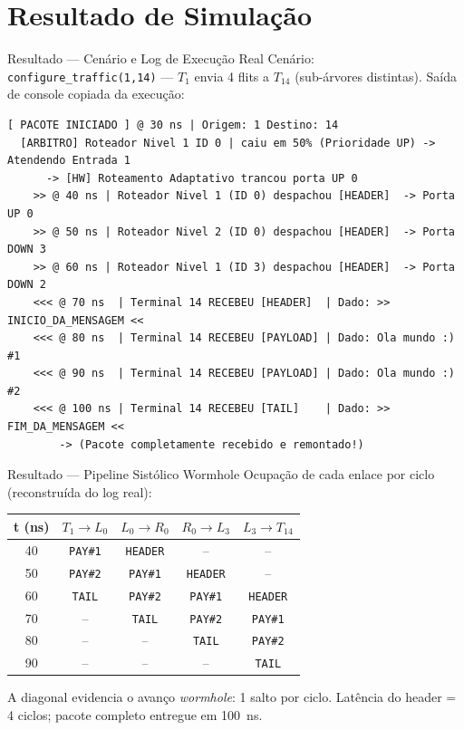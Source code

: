 \documentclass[aspectratio=169]{beamer}
\begin{document}
\section{Resultado de Simulação}

\begin{frame}[fragile]{Resultado --- Cenário e Log de Execução Real}
  \small Cenário: \texttt{configure\_traffic(1,14)} --- $T_1$ envia 4 flits a
  $T_{14}$ (sub-árvores distintas). Saída de console \alert{copiada da execução}:
  \vspace{2mm}
\begin{lstlisting}[style=log]
[ PACOTE INICIADO ] @ 30 ns | Origem: 1 Destino: 14
  [ARBITRO] Roteador Nivel 1 ID 0 | caiu em 50% (Prioridade UP) -> Atendendo Entrada 1
      -> [HW] Roteamento Adaptativo trancou porta UP 0
    >> @ 40 ns | Roteador Nivel 1 (ID 0) despachou [HEADER]  -> Porta UP 0
    >> @ 50 ns | Roteador Nivel 2 (ID 0) despachou [HEADER]  -> Porta DOWN 3
    >> @ 60 ns | Roteador Nivel 1 (ID 3) despachou [HEADER]  -> Porta DOWN 2
    <<< @ 70 ns  | Terminal 14 RECEBEU [HEADER]  | Dado: >> INICIO_DA_MENSAGEM <<
    <<< @ 80 ns  | Terminal 14 RECEBEU [PAYLOAD] | Dado: Ola mundo :) #1
    <<< @ 90 ns  | Terminal 14 RECEBEU [PAYLOAD] | Dado: Ola mundo :) #2
    <<< @ 100 ns | Terminal 14 RECEBEU [TAIL]    | Dado: >> FIM_DA_MENSAGEM <<
        -> (Pacote completamente recebido e remontado!)
\end{lstlisting}
\end{frame}

\begin{frame}{Resultado --- Pipeline Sistólico Wormhole}
  \centering
  Ocupação de cada enlace por ciclo (reconstruída do log real):
  \vspace{2mm}

  \renewcommand{\arraystretch}{1.2}
  \begin{tabular}{@{}c|cccc@{}}
    \toprule
    \textbf{t (ns)} & $T_1\!\to\!L_0$ & $L_0\!\to\!R_0$ & $R_0\!\to\!L_3$ & $L_3\!\to\!T_{14}$ \\
    \midrule
    40  & \texttt{PAY\#1} & \texttt{HEADER} & --              & --              \\
    50  & \texttt{PAY\#2} & \texttt{PAY\#1} & \texttt{HEADER} & --              \\
    60  & \texttt{TAIL}   & \texttt{PAY\#2} & \texttt{PAY\#1} & \texttt{HEADER} \\
    70  & --              & \texttt{TAIL}   & \texttt{PAY\#2} & \texttt{PAY\#1} \\
    80  & --              & --              & \texttt{TAIL}   & \texttt{PAY\#2} \\
    90  & --              & --              & --              & \texttt{TAIL}   \\
    \bottomrule
  \end{tabular}

  \vfill
  \small A diagonal evidencia o avanço \emph{wormhole}: 1 salto por ciclo.
  Latência do header = 4 ciclos; pacote completo entregue em \SI{100}{ns}.
\end{frame}
\end{document}
